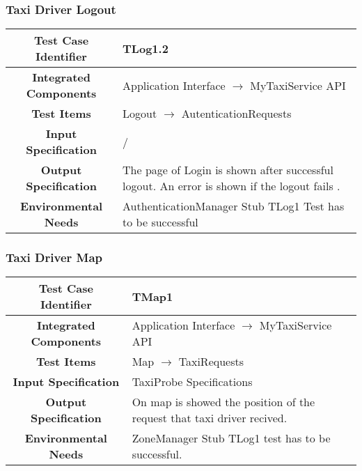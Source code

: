 \documentclass[11pt, a4paper,titlepage]{article}
\begin{document}
	\subsubsection{Taxi Driver Logout}
	\begin{tabularx}{\textwidth}{| c|X|}
		\hline \textbf{Test Case Identifier} & \label{TLog1.2}TLog1.2 \\
		\hline \textbf{Integrated Components} & Application Interface $\rightarrow $ MyTaxiService API \\
		\hline \textbf{Test Items} & Logout $\rightarrow $ AutenticationRequests \\
		\hline \textbf{Input Specification} & / \\
		\hline \textbf{Output Specification} & 
		The page of Login is shown after successful logout.\newline
		An error is shown if the logout fails .\\
		\hline \textbf{Environmental Needs} & AuthenticationManager Stub \newline	TLog1 Test has to be successful \\
		\hline
	\end{tabularx}
	\newline
	\newline
	\subsubsection{Taxi Driver Map}
	\begin{tabularx}{\textwidth}{| c|X|}
		\hline \textbf{Test Case Identifier} & \label{TMap1}TMap1 \\
		\hline \textbf{Integrated Components} & Application Interface $\rightarrow $ MyTaxiService API \\
		\hline \textbf{Test Items} & Map $\rightarrow $ TaxiRequests \\
		\hline \textbf{Input Specification} & TaxiProbe Specifications \\
		\hline \textbf{Output Specification} & On map is showed the position of the request that taxi driver recived. \\
		\hline \textbf{Environmental Needs} & ZoneManager Stub \newline TLog1 test has to be successful. \\
		\hline
	\end{tabularx}
	\newline
	\newline
\end{document}
